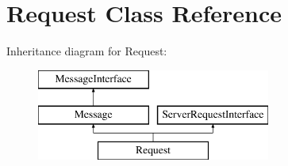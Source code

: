 \hypertarget{class_pes_1_1_http_1_1_request}{}\section{Request Class Reference}
\label{class_pes_1_1_http_1_1_request}
Inheritance diagram for Request\+:\begin{figure}[H]
\begin{center}
\leavevmode
\includegraphics[height=3.000000cm]{class_pes_1_1_http_1_1_request}
\end{center}
\end{figure}
